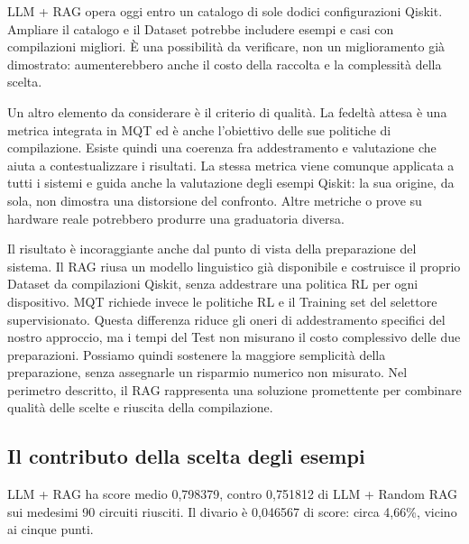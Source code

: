 LLM + RAG opera oggi entro un catalogo di sole dodici configurazioni Qiskit. Ampliare il catalogo e il Dataset potrebbe includere esempi e casi con compilazioni migliori. È una possibilità da verificare, non un miglioramento già dimostrato: aumenterebbero anche il costo della raccolta e la complessità della scelta.

Un altro elemento da considerare è il criterio di qualità. La fedeltà attesa è una metrica integrata in MQT ed è anche l’obiettivo delle sue politiche di compilazione. Esiste quindi una coerenza fra addestramento e valutazione che aiuta a contestualizzare i risultati. La stessa metrica viene comunque applicata a tutti i sistemi e guida anche la valutazione degli esempi Qiskit: la sua origine, da sola, non dimostra una distorsione del confronto. Altre metriche o prove su hardware reale potrebbero produrre una graduatoria diversa.

Il risultato è incoraggiante anche dal punto di vista della preparazione del sistema. Il RAG riusa un modello linguistico già disponibile e costruisce il proprio Dataset da compilazioni Qiskit, senza addestrare una politica RL per ogni dispositivo. MQT richiede invece le politiche RL e il Training set del selettore supervisionato. Questa differenza riduce gli oneri di addestramento specifici del nostro approccio, ma i tempi del Test non misurano il costo complessivo delle due preparazioni. Possiamo quindi sostenere la maggiore semplicità della preparazione, senza assegnarle un risparmio numerico non misurato. Nel perimetro descritto, il RAG rappresenta una soluzione promettente per combinare qualità delle scelte e riuscita della compilazione.
\subsection{Il contributo della scelta degli esempi}
LLM + RAG ha score medio 0,798379, contro 0,751812 di LLM + Random RAG sui medesimi 90 circuiti riusciti. Il divario è 0,046567 di score: circa 4,66\%, vicino ai cinque punti.


